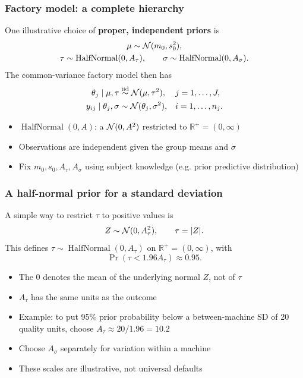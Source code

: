 \documentclass[10pt]{beamer}
\begin{document}
\begin{frame}
\frametitle{Factory model: a complete hierarchy}

  One illustrative choice of \textbf{proper, independent priors} is
  \[
    \begin{gathered}
      \mu\sim\mathcal{N}(m_0,s_0^2),\\
      \tau\sim\operatorname{HalfNormal}(0,A_\tau),\qquad
      \sigma\sim\operatorname{HalfNormal}(0,A_\sigma).
    \end{gathered}
  \]
  The common-variance factory model then has
  \begin{align*}
    \theta_j\mid\mu,\tau&\overset{\mathrm{iid}}{\sim}\mathcal{N}(\mu,\tau^2),
      &&j=1,\ldots,J,\\
    y_{ij}\mid\theta_j,\sigma&\sim\mathcal{N}(\theta_j,\sigma^2),
      &&i=1,\ldots,n_j.
  \end{align*}
  \begin{itemize}
  \item $\operatorname{HalfNormal}(0,A)$: a $\mathcal{N}(0,A^2)$ restricted to
    $\mathbb{R}^+=(0,\infty)$
  \item Observations are independent given the group means and $\sigma$
  \item Fix $m_0,s_0,A_\tau,A_\sigma$ using subject knowledge (e.g. prior predictive distribution)
  \end{itemize}
\end{frame}

\begin{frame}
\frametitle{A half-normal prior for a standard deviation}

  A simple way to restrict $\tau$ to positive values is
  \[
    Z\sim\mathcal{N}(0,A_\tau^2),\qquad \tau=|Z|.
  \]
  This defines $\tau\sim\operatorname{HalfNormal}(0,A_\tau)$ on
  $\mathbb{R}^+=(0,\infty)$, with
  \[
    \Pr(\tau<1.96A_\tau)\approx0.95.
  \]
  \begin{itemize}
  \item The 0 denotes the mean of the underlying normal $Z$, not of $\tau$
  \item $A_\tau$ has the same units as the outcome
  \item Example: to put 95\% prior probability below a between-machine
    SD of 20 quality units, choose $A_\tau\approx20/1.96=10.2$
  \item Choose $A_\sigma$ separately for variation within a machine
  \item These scales are illustrative, not universal defaults
  \end{itemize}
\end{frame}
\end{document}
